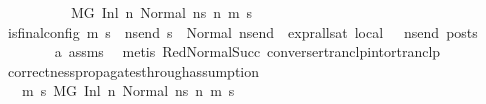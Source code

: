\begin{isabellebody}
\ \ \isamarkupfalse%
\ {\isacharminus}{\kern0pt}\isanewline
\ \ \ \ \isamarkupfalse%
\ {\isachardoublequoteopen}{\isacharparenleft}{\kern0pt}M{\isacharcomma}{\kern0pt}{\isasymLambda}{\isacharcomma}{\kern0pt}{\isasymGamma}{\isacharcomma}{\kern0pt}{\isasymOmega}{\isacharcomma}{\kern0pt}G\ {\isasymturnstile}{\isacharparenleft}{\kern0pt}Inl\ n{}{\isacharcomma}{\kern0pt}\ Normal\ ns{}{\isacharparenright}{\kern0pt}\ {\isacharminus}{\kern0pt}n{\isasymrightarrow}{\isacharasterisk}{\kern0pt}\ {\isacharparenleft}{\kern0pt}m{}{\isacharcomma}{\kern0pt}\ s{}{\isacharparenright}{\kern0pt}{\isacharparenright}{\kern0pt}{\isachardoublequoteclose}\isanewline
\ \ \ \ \isamarkupfalse%
\ {\isachardoublequoteopen}{\isacharparenleft}{\kern0pt}is{\isacharunderscore}{\kern0pt}final{\isacharunderscore}{\kern0pt}config\ {\isacharparenleft}{\kern0pt}m{}{\isacharcomma}{\kern0pt}\ s{}{\isacharparenright}{\kern0pt}\ {\isasymLongrightarrow}\ {\isacharparenleft}{\kern0pt}{\isasymforall}ns{\isacharunderscore}{\kern0pt}end{\isachardot}{\kern0pt}\ s{}\ {\isacharequal}{\kern0pt}\ Normal\ ns{\isacharunderscore}{\kern0pt}end\ {\isasymlongrightarrow}\ {\isacharparenleft}{\kern0pt}expr{\isacharunderscore}{\kern0pt}all{\isacharunderscore}{\kern0pt}sat\ {\isasymLambda}{}{\isacharunderscore}{\kern0pt}local\ {\isasymGamma}\ {\isasymOmega}\ ns{\isacharunderscore}{\kern0pt}end{\isacharparenright}{\kern0pt}\ posts{\isacharparenright}{\kern0pt}{\isacharparenright}{\kern0pt}{\isachardoublequoteclose}\ \isanewline
\ \ \ \ \ \ \isamarkupfalse%
\ a{}\ assms\ \isamarkupfalse%
\ {\isacharparenleft}{\kern0pt}metis\ RedNormalSucc\ converse{\isacharunderscore}{\kern0pt}rtranclp{\isacharunderscore}{\kern0pt}into{\isacharunderscore}{\kern0pt}rtranclp{\isacharparenright}{\kern0pt}\isanewline
\ \ \isamarkupfalse%
\isanewline
{}\isamarkupfalse%
%
\endisatagproof
{\isafoldproof}%
%
\isadelimproof
\isanewline
%
\endisadelimproof
\isanewline
{}\isamarkupfalse%
\ correctness{\isacharunderscore}{\kern0pt}propagates{\isacharunderscore}{\kern0pt}through{\isacharunderscore}{\kern0pt}assumption{}{\isacharcolon}{\kern0pt}\isanewline
\ \ \ {\isachardoublequoteopen}{\isasymforall}m\ s{\isachardot}{\kern0pt}\ {\isacharparenleft}{\kern0pt}M{\isacharcomma}{\kern0pt}{\isasymLambda}{\isacharcomma}{\kern0pt}{\isasymGamma}{\isacharcomma}{\kern0pt}{\isasymOmega}{\isacharcomma}{\kern0pt}G\ {\isasymturnstile}{\isacharparenleft}{\kern0pt}Inl\ n{}{\isacharcomma}{\kern0pt}\ Normal\ ns{}{\isacharparenright}{\kern0pt}\ {\isacharminus}{\kern0pt}n{\isasymrightarrow}{\isacharasterisk}{\kern0pt}\ {\isacharparenleft}{\kern0pt}m{\isacharcomma}{\kern0pt}\ s{\isacharparenright}{\kern0pt}{\isacharparenright}{\kern0pt}\ {\isasymlongrightarrow}\ \isanewline

\end{isabellebody}
